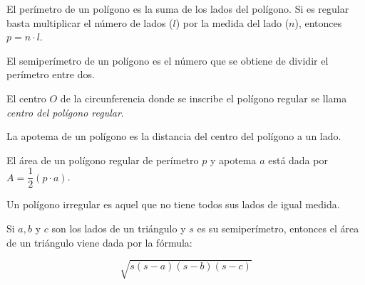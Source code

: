 \begin{definition}
    El perímetro de un polígono es la suma de los lados del polígono. Si es regular basta multiplicar el número de lados ($l$) por la medida del lado ($n$), entonces $p = n \cdot l$.
\end{definition}

\begin{definition}
    El semiperímetro de un polígono es el número que se obtiene de dividir el perímetro entre dos.
\end{definition}

\begin{definition}
    El centro $O$ de la circunferencia donde se inscribe el polígono regular se llama \textit{centro del polígono regular}.
\end{definition}

\begin{definition}
    La apotema de un polígono es la distancia del centro del polígono a un lado.
\end{definition}

\begin{theorem}
    El área de un polígono regular de perímetro $p$ y apotema $a$ está dada por $A = \dfrac{1}{2}(p \cdot a)$.
\end{theorem}

\begin{definition}
    Un polígono irregular es aquel que no tiene todos sus lados de igual medida.
\end{definition}

\begin{theorem}

Si $a,b$ y $c$ son los lados de un triángulo y $s$ es su semiperímetro, entonces el área de un triángulo viene dada por la fórmula:

$$\sqrt{s(s-a)(s-b)(s-c)}$$
    
\end{theorem}